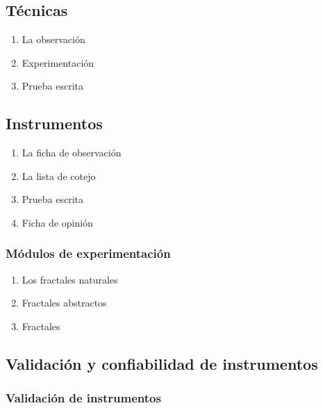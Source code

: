 \documentclass[12pt,]{report}
\begin{document}
\hypertarget{tuxe9cnicas}{%
\subsection{Técnicas}\label{tuxe9cnicas}}

\begin{enumerate}
\def\labelenumi{\arabic{enumi}.}
\item
  La observación
\item
  Experimentación
\item
  Prueba escrita
\end{enumerate}

\hypertarget{instrumentos}{%
\subsection{Instrumentos}\label{instrumentos}}

\begin{enumerate}
\def\labelenumi{\arabic{enumi}.}
\item
  La ficha de observación
\item
  La lista de cotejo
\item
  Prueba escrita
\item
  Ficha de opinión
\end{enumerate}

\hypertarget{muxf3dulos-de-experimentaciuxf3n}{%
\subsubsection{Módulos de experimentación}\label{muxf3dulos-de-experimentaciuxf3n}}

\begin{enumerate}
\def\labelenumi{\arabic{enumi}.}
\item
  Los fractales naturales
\item
  Fractales abstractos
\item
  Fractales
\end{enumerate}

\hypertarget{validaciuxf3n-y-confiabilidad-de-instrumentos}{%
\subsection{Validación y confiabilidad de instrumentos}\label{validaciuxf3n-y-confiabilidad-de-instrumentos}}

\hypertarget{validaciuxf3n-de-instrumentos}{%
\subsubsection{Validación de instrumentos}\label{validaciuxf3n-de-instrumentos}}
\end{document}
